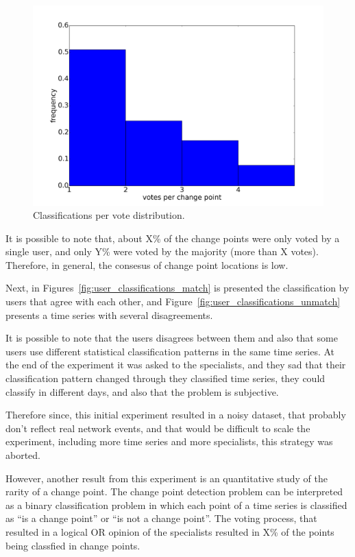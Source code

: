 \begin{figure}[H]
    \centering
    \includegraphics[width=0.9\linewidth]{./figures/methodology/supervised_learning_try/cnt_classifications_per_vote.png}
    \caption{Classifications per vote distribution.}
\label{fig:classifications_per_vote}
\end{figure}%

It is possible to note that, about X\% of the change points were only voted by
a single user, and only Y\% were voted by the majority (more than X votes).
Therefore, in general,
the consesus of change point locations is low.

Next, in Figures~\ref{fig:user_classifications_match} is presented the
classification by users that agree with each other, and
Figure~\ref{fig:user_classifications_unmatch} presents a time series with
several disagreements.

It is possible to note that the users disagrees between them and also that some
users use different statistical classification patterns in the same time
series. At the end of the experiment it was asked to the specialists, and they
sad that their classification pattern changed through they classified time
series, they could classify in different days, and also that the problem is
subjective.

Therefore since, this initial experiment resulted in a noisy dataset, that
probably don't reflect real network events, and that
would be difficult to scale the experiment, including more time series and more
specialists, this strategy was aborted.

However, another result from this experiment is an quantitative study of the
rarity of a
change point. The change point detection problem can be interpreted as a binary
classification problem in which each point of a time series is classified as
``is a change point'' or ``is not a change point''. The voting process, that
resulted in a logical OR opinion of the specialists resulted in X\% of the
points being classfied in change points.

